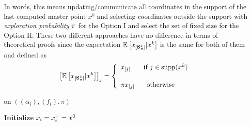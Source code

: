 In words, this means updating/communicate all coordinates in the support of the last computed master point $x^k$ and selecting coordinates outside the support with \emph{exploration probability} $\pi$ for the Option I and select the set of fixed size for the Option II. These two different approaches have no difference in terms of theoretical proofs since the expectation $\mathbb{E}\left[x_{[\mathbf{S}_{\pi}^k]}|x^k\right]$ is the same for both of them and defined as
$$
\left[\EE\left[x_{[\mathbf{S}_{\pi}^k]}|x^k\right]\right]_j = \left\{\begin{array}{ll}
 x_{[j]}  \hspace*{-0.2cm}  &  \hspace*{0ex} \text{ if } j\in\supp(x^k)  \\[0.5cm]
\pi x_{[j]} & \hspace*{1ex}\text{ otherwise }
\end{array}
\right.
$$
\begin{algorithm}[t!]
\caption{\textsc{\spyI} on $((\alpha_i),(f_i),\pi)$}
\label{alg:soda}

\begin{center}
\begin{tcolorbox}[title=\textsc{Worker } $i$]
\begin{algorithmic}
\STATE \textbf{Initialize} $x_i = x_i^+ = \bar{x}^0$\\
\ENDWHILE

\end{algorithmic}
\end{tcolorbox}
\end{center}
\end{algorithm}
